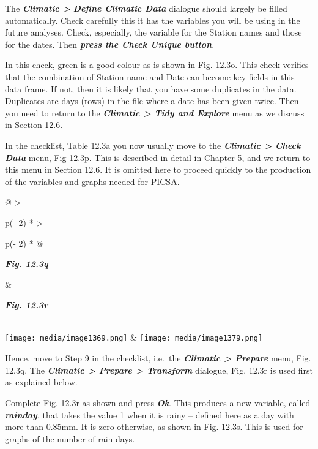 \documentclass[
  letterpaper,
  DIV=11,
  numbers=noendperiod]{scrreprt}
\begin{document}
The \textbf{\emph{Climatic \textgreater{}}} \textbf{\emph{Define
Climatic Data}} dialogue should largely be filled automatically. Check
carefully this it has the variables you will be using in the future
analyses. Check, especially, the variable for the Station names and
those for the dates. Then \textbf{\emph{press the Check Unique button}}.

In this check, green is a good colour as is shown in Fig. 12.3o. This
check verifies that the combination of Station name and Date can become
key fields in this data frame. If not, then it is likely that you have
some duplicates in the data. Duplicates are days (rows) in the file
where a date has been given twice. Then you need to return to the
\textbf{\emph{Climatic \textgreater{} Tidy and Explore}} menu as we
discuss in Section 12.6.

In the checklist, Table 12.3a you now usually move to the
\textbf{\emph{Climatic \textgreater{} Check Data}} menu, Fig 12.3p. This
is described in detail in Chapter 5, and we return to this menu in
Section 12.6. It is omitted here to proceed quickly to the production of
the variables and graphs needed for PICSA.

\begin{longtable}[]{@{}
  >{\raggedright\arraybackslash}p{(\columnwidth - 2\tabcolsep) * }
  >{\raggedright\arraybackslash}p{(\columnwidth - 2\tabcolsep) * }@{}}
\toprule\noalign{}
\begin{minipage}[b]{\linewidth}\raggedright
\textbf{\emph{Fig. 12.3q}}
\end{minipage} & \begin{minipage}[b]{\linewidth}\raggedright
\textbf{\emph{Fig. 12.3r}}
\end{minipage} \\
\midrule\noalign{}
\endhead
\bottomrule\noalign{}
\endlastfoot
\texttt{[image: media/image1369.png]}
&
\texttt{[image: media/image1379.png]} \\
\end{longtable}

Hence, move to Step 9 in the checklist, i.e.~the \textbf{\emph{Climatic
\textgreater{} Prepare}} menu, Fig. 12.3q. The \textbf{\emph{Climatic
\textgreater{} Prepare \textgreater{} Transform}} dialogue, Fig. 12.3r
is used first as explained below.

Complete Fig. 12.3r as shown and press \textbf{\emph{Ok}}. This produces
a new variable, called \textbf{\emph{rainday}}, that takes the value 1
when it is rainy -- defined here as a day with more than 0.85mm. It is
zero otherwise, as shown in Fig. 12.3s. This is used for graphs of the
number of rain days.
\end{document}
